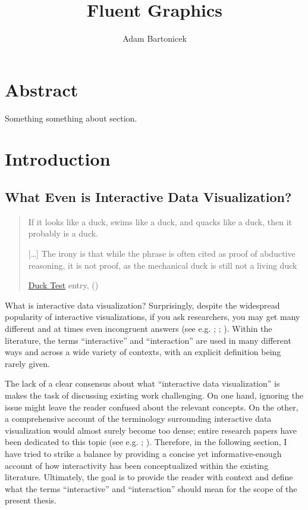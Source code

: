 \documentclass[
]{book}
\title{Fluent Graphics}
\author{Adam Bartonicek}
\date{}
\theoremstyle{definition}
\theoremstyle{definition}
\theoremstyle{definition}
\theoremstyle{definition}
\theoremstyle{remark}
\begin{document}
\maketitle

{
\setcounter{tocdepth}{1}
\tableofcontents
}
\chapter{Abstract}\label{abstract}

Something something about section.

\chapter{Introduction}\label{introduction}

\section{What Even is Interactive Data Visualization?}\label{what-is-interactive-visualization}

\begin{quote}
If it looks like a duck, swims like a duck, and quacks like a duck, then it probably is a duck.

{[}\ldots{]} The irony is that while the phrase is often cited as proof of abductive reasoning, it is not proof, as the mechanical duck is still not a living duck

\href{https://en.wikipedia.org/wiki/Duck_test}{Duck Test} entry, ()
\end{quote}

What is interactive data visualization? Surprisingly, despite the widespread popularity of interactive visualizations, if you ask researchers, you may get many different and at times even incongruent answers (see e.g. ; ; ). Within the literature, the terms ``interactive'' and ``interaction'' are used in many different ways and across a wide variety of contexts, with an explicit definition being rarely given.

The lack of a clear consensus about what ``interactive data visualization'' is makes the task of discussing existing work challenging. On one hand, ignoring the issue might leave the reader confused about the relevant concepts. On the other, a comprehensive account of the terminology surrounding interactive data visualization would almost surely become too dense; entire research papers have been dedicated to this topic (see e.g. ; ). Therefore, in the following section, I have tried to strike a balance by providing a concise yet informative-enough account of how interactivity has been conceptualized within the existing literature. Ultimately, the goal is to provide the reader with context and define what the terms ``interactive'' and ``interaction'' should mean for the scope of the present thesis.
\end{document}
